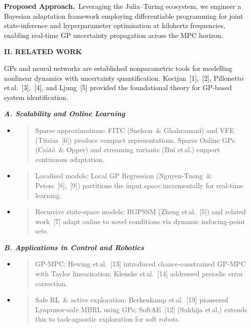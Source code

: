 \documentclass[letterpaper, 10pt, journal, twoside]{IEEEtran}
\begin{document}
\textbf{Proposed Approach. }Leveraging the Julia--Turing ecosystem, we
engineer a Bayesian adaptation framework employing differentiable
programming for joint state-inference and hyperparameter optimisation at
kilohertz frequencies, enabling real-time GP uncertainty propagation
across the MPC horizon.

\textbf{II. RELATED WORK}

GPs and neural networks are established nonparametric tools for
modelling nonlinear dynamics with uncertainty quantification.
Kocijan~{[}1{]},~{[}2{]}, Pillonetto et\,al.~{[}3{]},~{[}4{]}, and
Ljung~{[}5{]} provided the foundational theory for GP-based system
identification.

\emph{\textbf{A. Scalability and Online Learning}}

\begin{itemize}
\item
  \begin{quote}
  Sparse approximations: FITC (Snelson~\& Ghahramani) and VFE
  (Titsias~{[}6{]}) produce compact representations. Sparse Online GPs
  (Csátó~\& Opper) and streaming variants (Bui et\,al.) support
  continuous adaptation.
  \end{quote}
\item
  \begin{quote}
  Localised models: Local GP Regression (Nguyen-Tuong~\&
  Peters~{[}8{]},~{[}9{]}) partitions the input space incrementally for
  real-time learning.
  \end{quote}
\item
  \begin{quote}
  Recursive state-space models: RGPSSM (Zheng et\,al.~{[}5{]}) and
  related work~{[}7{]} adapt online to novel conditions via dynamic
  inducing-point sets.
  \end{quote}
\end{itemize}

\emph{\textbf{B. Applications in Control and Robotics}}

\begin{itemize}
\item
  \begin{quote}
  GP-MPC: Hewing et\,al.~{[}13{]} introduced chance-constrained GP-MPC
  with Taylor linearisation; Klenske et\,al.~{[}14{]} addressed periodic
  error correction.
  \end{quote}
\item
  \begin{quote}
  Safe RL~\& active exploration: Berkenkamp et\,al.~{[}19{]} pioneered
  Lyapunov-safe MBRL using GPs; SoftAE~{[}12{]} (Sukhija et\,al.)
  extends this to task-agnostic exploration for soft robots.
  \end{quote}
\end{itemize}
\end{document}

